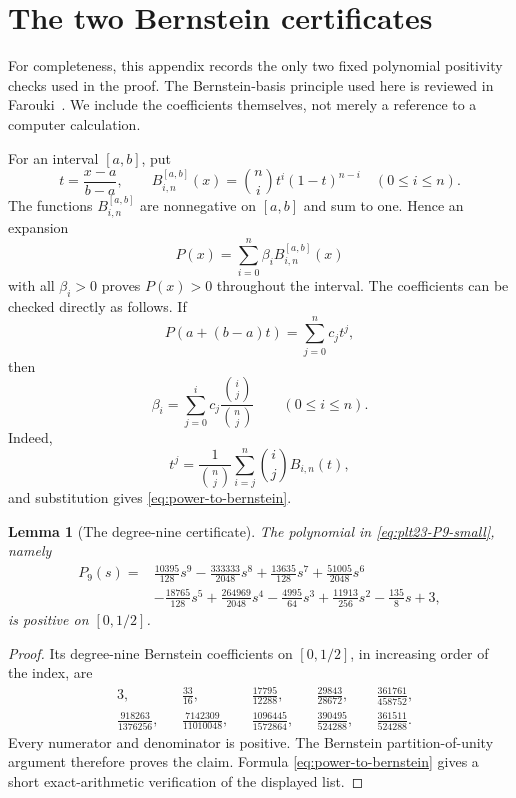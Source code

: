 \documentclass[11pt]{article}
\newtheorem{lemma}[theorem]{Lemma}
\numberwithin{equation}{section}
\begin{document}
\section{The two Bernstein certificates}\label{app:bernstein}

For completeness, this appendix records the only two fixed polynomial positivity checks used in the proof.
The Bernstein-basis principle used here is reviewed in Farouki~\cite{Farouki2012}.
We include the coefficients themselves, not merely a reference to a computer calculation.

For an interval $[a,b]$, put
\[
  t=\frac{x-a}{b-a},
  \qquad
  B^{[a,b]}_{i,n}(x)=\binom ni t^i(1-t)^{n-i}
  \quad(0\le i\le n).
\]
The functions $B^{[a,b]}_{i,n}$ are nonnegative on $[a,b]$ and sum to one.
Hence an expansion
\[
  P(x)=\sum_{i=0}^n \beta_i B^{[a,b]}_{i,n}(x)
\]
with all $\beta_i>0$ proves $P(x)>0$ throughout the interval.
The coefficients can be checked directly as follows.
If
\[
  P(a+(b-a)t)=\sum_{j=0}^n c_jt^j,
\]
then
\begin{equation}\label{eq:power-to-bernstein}
  \beta_i=
  \sum_{j=0}^i c_j\frac{\binom ij}{\binom nj}
  \qquad(0\le i\le n).
\end{equation}
Indeed,
\[
  t^j=\frac{1}{\binom nj}
  \sum_{i=j}^n\binom ij B_{i,n}(t),
\]
and substitution gives \eqref{eq:power-to-bernstein}.

\begin{lemma}[The degree-nine certificate]\label{lem:bernstein-P9}
  The polynomial in \eqref{eq:plt23-P9-small}, namely
  \begin{align*}
    P_9(s)={}&
    \frac{10395}{128}s^9
    -\frac{333333}{2048}s^8
    +\frac{13635}{128}s^7
    +\frac{51005}{2048}s^6\\
    &-\frac{18765}{128}s^5
    +\frac{264969}{2048}s^4
    -\frac{4995}{64}s^3
    +\frac{11913}{256}s^2
    -\frac{135}{8}s+3,
  \end{align*}
  is positive on $[0,1/2]$.
\end{lemma}

\begin{proof}
  Its degree-nine Bernstein coefficients on $[0,1/2]$, in increasing order of the index, are
  \begin{align*}
    &3,
    &&\frac{33}{16},
    &&\frac{17795}{12288},
    &&\frac{29843}{28672},
    &&\frac{361761}{458752},\\[1mm]
    &\frac{918263}{1376256},
    &&\frac{7142309}{11010048},
    &&\frac{1096445}{1572864},
    &&\frac{390495}{524288},
    &&\frac{361511}{524288}.
  \end{align*}
  Every numerator and denominator is positive.
  The Bernstein partition-of-unity argument therefore proves the claim.
  Formula \eqref{eq:power-to-bernstein} gives a short exact-arithmetic verification of the displayed list.
\end{proof}
\end{document}
